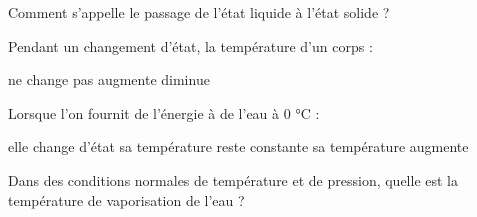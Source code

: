 \begin{questions}
	
	\question[2] Comment s'appelle le passage de l'état liquide à l'état solide ?
	\fillwithdottedlines{1.5cm}
	
	\question[2] Pendant un changement d'état, la température d'un corps :
	\begin{checkboxes}
		\correctchoice ne change pas
		\choice augmente
		\choice diminue
	\end{checkboxes}
	
	\vspace*{1cm}
	\question[2] Lorsque l'on fournit de l'énergie à de l'eau à 0 °C :
	\begin{checkboxes}
		\correctchoice elle change d'état
		\choice sa température reste constante
		\choice sa température augmente
	\end{checkboxes}
	
	\vspace*{1cm}
	\question[2] Dans des conditions normales de température et de pression, quelle est la température de vaporisation de l'eau ?
	
	\fillwithdottedlines{1.5cm}
	
	
	
\end{questions}

